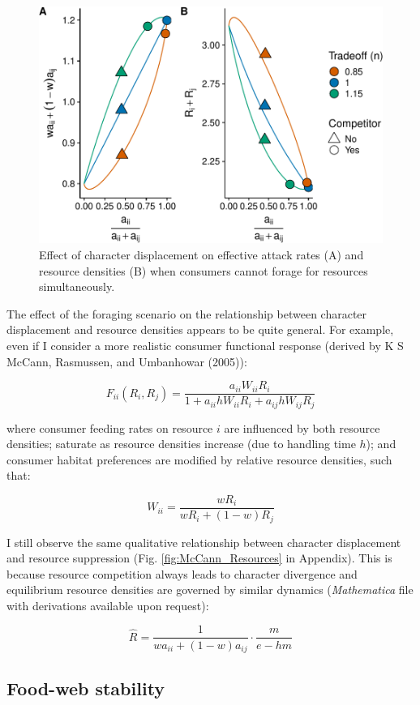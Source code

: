 \documentclass[11pt,]{article}
\begin{document}
\begin{figure}
\centering
\includegraphics{ECD_Supp_Mat_files/figure-latex/LS_Resources-1.pdf}
\caption{\label{fig:LS_Resources}Effect of character displacement on
effective attack rates (A) and resource densities (B) when consumers
cannot forage for resources simultaneously.}
\end{figure}

The effect of the foraging scenario on the relationship between
character displacement and resource densities appears to be quite
general. For example, even if I consider a more realistic consumer
functional response (derived by K S McCann, Rasmussen, and Umbanhowar
(2005)):

\[F_{ii}(R_i,R_j)=\frac{a_{ii}W_{ii}R_i}{1+a_{ii}hW_{ii}R_i+a_{ij}hW_{ij}R_j}\]

where consumer feeding rates on resource \(i\) are influenced by both
resource densities; saturate as resource densities increase (due to
handling time \(h\)); and consumer habitat preferences are modified by
relative resource densities, such that:

\[W_{ii}=\frac{wR_i}{wR_i+(1-w)R_j}\]

I still observe the same qualitative relationship between character
displacement and resource suppression (Fig. \ref{fig:McCann_Resources}
in Appendix). This is because resource competition always leads to
character divergence and equilibrium resource densities are governed by
similar dynamics (\emph{Mathematica} file with derivations available
upon request):

\[\hat{R}=\frac{1}{wa_{ii}+(1-w)a_{ij}}\cdot\frac{m}{e-hm}\]

\subsection{Food-web stability}\label{food-web-stability}
\end{document}
